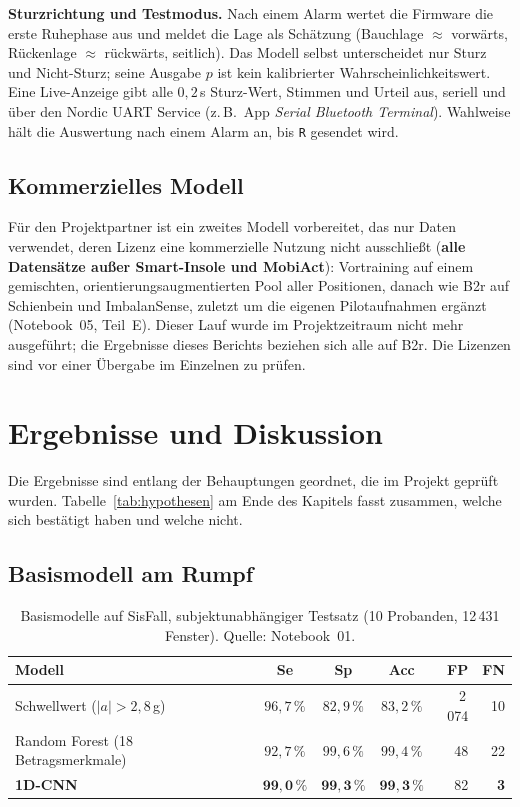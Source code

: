 \documentclass[11pt,a4paper,oneside,parskip=half,open=any,
               numbers=noenddot,listof=totoc,bibliography=totoc]{scrreprt}
\begin{document}
\textbf{Sturzrichtung und Testmodus.} Nach einem Alarm wertet die
Firmware die erste Ruhephase aus und meldet die Lage als Schätzung
(Bauchlage $\approx$ vorwärts, Rückenlage $\approx$ rückwärts, seitlich).
Das Modell selbst unterscheidet nur Sturz und Nicht-Sturz; seine Ausgabe
$p$ ist kein kalibrierter Wahrscheinlichkeitswert. Eine Live-Anzeige
gibt alle $0{,}2$\,s Sturz-Wert, Stimmen und Urteil aus, seriell und
über den Nordic UART Service (z.\,B.\ App \emph{Serial Bluetooth
Terminal}). Wahlweise hält die Auswertung nach einem Alarm an, bis
\texttt{R} gesendet wird.

\section{Kommerzielles Modell}
Für den Projektpartner ist ein zweites Modell vorbereitet, das nur Daten
verwendet, deren Lizenz eine kommerzielle Nutzung nicht ausschließt
(\textbf{alle Datensätze außer Smart-Insole und MobiAct}): Vortraining
auf einem gemischten, orientierungsaugmentierten Pool aller Positionen,
danach wie B2r auf Schienbein und ImbalanSense, zuletzt um die eigenen
Pilotaufnahmen ergänzt (Notebook~05, Teil~E). Dieser Lauf wurde im
Projektzeitraum nicht mehr ausgeführt; die Ergebnisse dieses Berichts
beziehen sich alle auf B2r. Die Lizenzen sind vor einer Übergabe im
Einzelnen zu prüfen.

\chapter{Ergebnisse und Diskussion}
\label{ch:ergebnisse}
Die Ergebnisse sind entlang der Behauptungen geordnet, die im Projekt
geprüft wurden. Tabelle~\ref{tab:hypothesen} am Ende des Kapitels fasst
zusammen, welche sich bestätigt haben und welche nicht.

\section{Basismodell am Rumpf}
\begin{table}[H]
\centering\small
\caption{Basismodelle auf SisFall, subjektunabhängiger Testsatz
(10 Probanden, 12\,431 Fenster). Quelle: Notebook~01.}
\label{tab:basis}
\begin{tabularx}{0.85\textwidth}{Y c c c r r}
\toprule
\textbf{Modell} & \textbf{Se} & \textbf{Sp} & \textbf{Acc} & \textbf{FP} & \textbf{FN} \\
\midrule
Schwellwert ($|a| > 2{,}8$\,g) & $96{,}7\,\%$ & $82{,}9\,\%$ & $83{,}2\,\%$ & 2\,074 & 10 \\
Random Forest (18 Betragsmerkmale) & $92{,}7\,\%$ & $99{,}6\,\%$ & $99{,}4\,\%$ & 48 & 22 \\
\textbf{1D-CNN} & $\mathbf{99{,}0\,\%}$ & $\mathbf{99{,}3\,\%}$ & $\mathbf{99{,}3\,\%}$ & 82 & \textbf{3} \\
\bottomrule
\end{tabularx}
\end{table}
\end{document}

